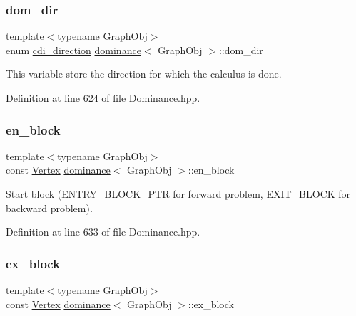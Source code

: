 \subsubsection{\texorpdfstring{dom\+\_\+dir}{dom\_dir}}
{\footnotesize\ttfamily template$<$typename Graph\+Obj$>$ \\
enum \hyperlink{classdominance_a983b27e93af6a5d375c01d81c2c30c40}{cdi\+\_\+direction} \hyperlink{classdominance}{dominance}$<$ Graph\+Obj $>$\+::dom\+\_\+dir\hspace{0.3cm}{\ttfamily [private]}}



This variable store the direction for which the calculus is done. 



Definition at line 624 of file Dominance.\+hpp.

\mbox{\label{classdominance_a11217422f64f86c44f61c5502fff5980}} 
\subsubsection{\texorpdfstring{en\+\_\+block}{en\_block}}
{\footnotesize\ttfamily template$<$typename Graph\+Obj$>$ \\
const \hyperlink{classdominance_acc73faf26e73171b15fd0ff6c63ca393}{Vertex} \hyperlink{classdominance}{dominance}$<$ Graph\+Obj $>$\+::en\+\_\+block\hspace{0.3cm}{\ttfamily [private]}}



Start block (E\+N\+T\+R\+Y\+\_\+\+B\+L\+O\+C\+K\+\_\+\+P\+TR for forward problem, E\+X\+I\+T\+\_\+\+B\+L\+O\+CK for backward problem). 



Definition at line 633 of file Dominance.\+hpp.

\mbox{\label{classdominance_aefb0058739be971542af222ee24d8c72}} 
\subsubsection{\texorpdfstring{ex\+\_\+block}{ex\_block}}
{\footnotesize\ttfamily template$<$typename Graph\+Obj$>$ \\
const \hyperlink{classdominance_acc73faf26e73171b15fd0ff6c63ca393}{Vertex} \hyperlink{classdominance}{dominance}$<$ Graph\+Obj $>$\+::ex\+\_\+block\hspace{0.3cm}{\ttfamily [private]}}



